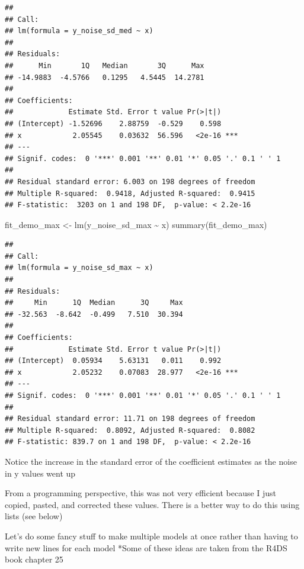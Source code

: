 \documentclass[
]{book}
\newenvironment{Shaded}{\begin{snugshade}}{\end{snugshade}}
\newcommand{\FunctionTok}[1]{\textcolor[rgb]{0.00,0.00,0.00}{#1}}
\newcommand{\NormalTok}[1]{#1}
\newcommand{\OtherTok}[1]{\textcolor[rgb]{0.56,0.35,0.01}{#1}}
\newcommand{\SpecialCharTok}[1]{\textcolor[rgb]{0.00,0.00,0.00}{#1}}
\begin{document}
\begin{verbatim}
## 
## Call:
## lm(formula = y_noise_sd_med ~ x)
## 
## Residuals:
##      Min       1Q   Median       3Q      Max 
## -14.9883  -4.5766   0.1295   4.5445  14.2781 
## 
## Coefficients:
##             Estimate Std. Error t value Pr(>|t|)    
## (Intercept) -1.52696    2.88759  -0.529    0.598    
## x            2.05545    0.03632  56.596   <2e-16 ***
## ---
## Signif. codes:  0 '***' 0.001 '**' 0.01 '*' 0.05 '.' 0.1 ' ' 1
## 
## Residual standard error: 6.003 on 198 degrees of freedom
## Multiple R-squared:  0.9418, Adjusted R-squared:  0.9415 
## F-statistic:  3203 on 1 and 198 DF,  p-value: < 2.2e-16
\end{verbatim}

\begin{Shaded}
\begin{Highlighting}[]
\NormalTok{fit\_demo\_max }\OtherTok{\textless{}{-}} \FunctionTok{lm}\NormalTok{(y\_noise\_sd\_max }\SpecialCharTok{\textasciitilde{}}\NormalTok{ x)}
\FunctionTok{summary}\NormalTok{(fit\_demo\_max)}
\end{Highlighting}
\end{Shaded}

\begin{verbatim}
## 
## Call:
## lm(formula = y_noise_sd_max ~ x)
## 
## Residuals:
##     Min      1Q  Median      3Q     Max 
## -32.563  -8.642  -0.499   7.510  30.394 
## 
## Coefficients:
##             Estimate Std. Error t value Pr(>|t|)    
## (Intercept)  0.05934    5.63131   0.011    0.992    
## x            2.05232    0.07083  28.977   <2e-16 ***
## ---
## Signif. codes:  0 '***' 0.001 '**' 0.01 '*' 0.05 '.' 0.1 ' ' 1
## 
## Residual standard error: 11.71 on 198 degrees of freedom
## Multiple R-squared:  0.8092, Adjusted R-squared:  0.8082 
## F-statistic: 839.7 on 1 and 198 DF,  p-value: < 2.2e-16
\end{verbatim}

Notice the increase in the standard error of the coefficient estimates as the noise in y values went up

From a programming perspective, this was not very efficient because I just copied, pasted, and corrected these values.
There is a better way to do this using lists (see below)

Let's do some fancy stuff to make multiple models at once rather than having to write new lines for each model
*Some of these ideas are taken from the R4DS book chapter 25
\end{document}
